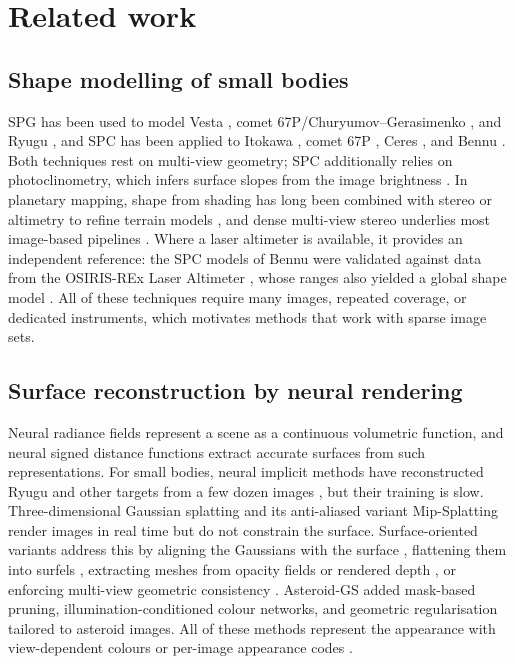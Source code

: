 \documentclass[fleqn,usenatbib]{aa}
\begin{document}
\section{Related work}
\label{sec:related}

\subsection{Shape modelling of small bodies}

SPG has been used to model Vesta \citep{Jaumann2012}, comet 67P/Churyumov--Gerasimenko \citep{Preusker2015,Preusker2017},
and Ryugu \citep{Watanabe2019}, and SPC has been applied to Itokawa \citep{Gaskell2008}, comet 67P \citep{Jorda2016},
Ceres \citep{Park2019}, and Bennu \citep{Palmer2022}. Both techniques rest on multi-view geometry; SPC additionally
relies on photoclinometry, which infers surface slopes from the image brightness \citep{Horn1990}. In planetary mapping,
shape from shading has long been combined with stereo or altimetry to refine terrain models
\citep{Kirk2003,Grumpe2014,Alexandrov2018}, and dense multi-view stereo underlies most image-based pipelines
\citep{Furukawa2010,Schonberger2016MVS}. Where a laser altimeter is available, it provides an independent reference:
the SPC models of Bennu were validated against data from the OSIRIS-REx Laser Altimeter
\citep{Daly2017,Barnouin2019,AlAsad2021}, whose ranges also yielded a global shape model \citep{Seabrook2022}. All of
these techniques require many images, repeated coverage, or dedicated instruments, which motivates methods that work
with sparse image sets.

\subsection{Surface reconstruction by neural rendering}

Neural radiance fields \citep{Mildenhall2020} represent a scene as a continuous volumetric function, and neural signed
distance functions \citep{Wang2021NeuS,Li2023Neuralangelo} extract accurate surfaces from such representations. For
small bodies, neural implicit methods have reconstructed Ryugu and other targets from a few dozen images
\citep{ChenS2024,ChenH2024,ChenH2025}, but their training is slow. Three-dimensional Gaussian splatting
\citep{Kerbl2023} and its anti-aliased variant Mip-Splatting \citep{Yu2024Mip} render images in real time but do not
constrain the surface. Surface-oriented variants address this by aligning the Gaussians with the surface
\citep{Guedon2024}, flattening them into surfels \citep{Huang2024,Dai2024Surfels}, extracting meshes from opacity
fields \citep{Yu2024GOF} or rendered depth \citep{Zhang2024RaDe}, or enforcing multi-view geometric consistency
\citep{Chen2024PGSR}. Asteroid-GS \citep{Zhang2025AsteroidGS} added mask-based pruning, illumination-conditioned colour
networks, and geometric regularisation tailored to asteroid images. All of these methods represent the appearance with
view-dependent colours or per-image appearance codes \citep{MartinBrualla2021}.
\end{document}
